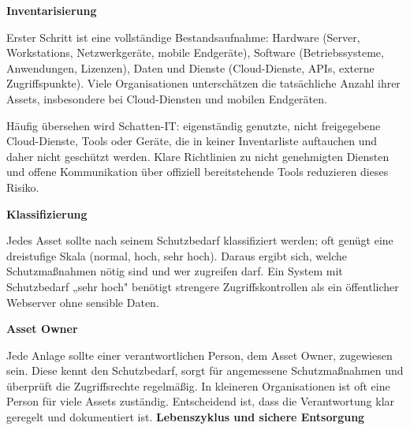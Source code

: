 \textbf{Inventarisierung}

Erster Schritt ist eine vollständige Bestandsaufnahme: Hardware (Server, Workstations, Netzwerkgeräte, mobile Endgeräte), Software (Betriebssysteme, Anwendungen, Lizenzen), Daten und Dienste (Cloud-Dienste, APIs, externe Zugriffspunkte). Viele Organisationen unterschätzen die tatsächliche Anzahl ihrer Assets, insbesondere bei Cloud-Diensten und mobilen Endgeräten.

Häufig übersehen wird Schatten-IT: eigenständig genutzte, nicht freigegebene Cloud-Dienste, Tools oder Geräte, die in keiner Inventarliste auftauchen und daher nicht geschützt werden. Klare Richtlinien zu nicht genehmigten Diensten und offene Kommunikation über offiziell bereitstehende Tools reduzieren dieses Risiko.

\textbf{Klassifizierung}

Jedes Asset sollte nach seinem Schutzbedarf klassifiziert werden; oft genügt eine dreistufige Skala (normal, hoch, sehr hoch). Daraus ergibt sich, welche Schutzmaßnahmen nötig sind und wer zugreifen darf. Ein System mit Schutzbedarf „sehr hoch" benötigt strengere Zugriffskontrollen als ein öffentlicher Webserver ohne sensible Daten.

\textbf{Asset Owner}

Jede Anlage sollte einer verantwortlichen Person, dem Asset Owner, zugewiesen sein. Diese kennt den Schutzbedarf, sorgt für angemessene Schutzmaßnahmen und überprüft die Zugriffsrechte regelmäßig. In kleineren Organisationen ist oft eine Person für viele Assets zuständig. Entscheidend ist, dass die Verantwortung klar geregelt und dokumentiert ist.
\newpage
\textbf{Lebenszyklus und sichere Entsorgung}

